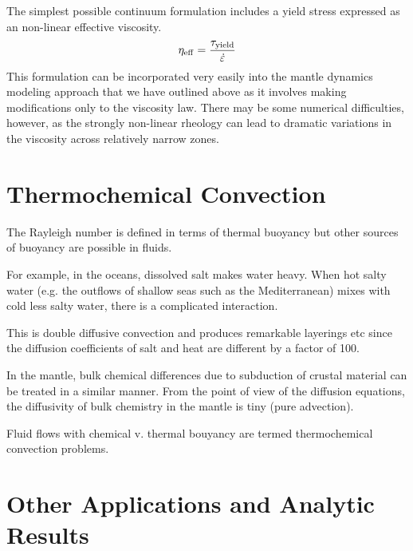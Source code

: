 \documentclass[10pt]{article}
\begin{document}
	The simplest possible continuum formulation includes a yield stress expressed 
	as an non-linear effective viscosity.
			\begin{equation}
				\eta_{\rm eff} = \frac{\tau_{\rm yield}}{\dot{\varepsilon}}
			\end{equation}
	This formulation can be incorporated very easily into the mantle dynamics modeling approach
	that we have outlined above as it involves making modifications only to the viscosity law.
	There may be some numerical difficulties, however, as the strongly non-linear rheology can
	lead to dramatic variations in the viscosity across relatively narrow zones.
	
	

	
	
	
	
	
		
	\section{Thermochemical Convection}
	
		The Rayleigh number is defined in terms of thermal
		buoyancy but other sources of buoyancy are possible in fluids.
		
		For example, in the oceans, dissolved salt makes water heavy. When
		hot salty water (e.g. the outflows of shallow seas such as the Mediterranean)
		mixes with cold less salty water, there is a complicated interaction.
		
		This is double diffusive convection and produces 
		remarkable layerings etc since the diffusion coefficients 
		of salt and heat are different by a factor of 100.
		
		In the mantle, bulk chemical differences due to subduction of 
		crustal material can be treated in a similar manner. From the point
		of view of the diffusion equations, the diffusivity of bulk chemistry in
		the mantle is tiny (pure advection).
		
		Fluid flows with chemical v. thermal bouyancy are termed
		thermochemical convection problems. 
		
	
	\section{Other Applications and Analytic Results}
	
\end{document}
